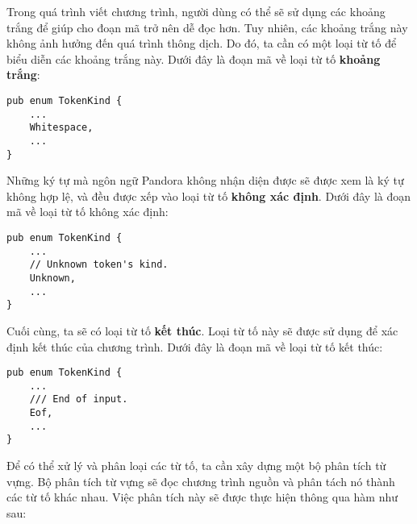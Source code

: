     Trong quá trình viết chương trình, người dùng có thể sẽ sử dụng các khoảng trắng để giúp cho đoạn mã trở nên dễ đọc hơn. Tuy nhiên, các khoảng trắng này không ảnh hưởng đến quá trình thông dịch. Do đó, ta cần có một loại từ tố để biểu diễn các khoảng trắng này. Dưới đây là đoạn mã về loại từ tố \textbf{khoảng trắng}:

\begin{lstlisting}[]
pub enum TokenKind {
    ...
    Whitespace,
    ...
}
\end{lstlisting}

    Những ký tự mà ngôn ngữ Pandora không nhận diện được sẽ được xem là ký tự không hợp lệ, và đều được xếp vào loại từ tố \textbf{không xác định}. Dưới đây là đoạn mã về loại từ tố không xác định:

\begin{lstlisting}[]
pub enum TokenKind {
    ...
    // Unknown token's kind.
    Unknown,
    ...
}
\end{lstlisting}

    Cuối cùng, ta sẽ có loại từ tố \textbf{kết thúc}. Loại từ tố này sẽ được sử dụng để xác định kết thúc của chương trình. Dưới đây là đoạn mã về loại từ tố kết thúc:

\begin{lstlisting}[]
pub enum TokenKind {
    ...
    /// End of input.
    Eof,
    ...
}
\end{lstlisting}

Để có thể xử lý và phân loại các từ tố, ta cần xây dựng một bộ phân tích từ vựng. Bộ phân tích từ vựng sẽ đọc chương trình nguồn và phân tách nó thành các từ tố khác nhau. Việc phân tích này sẽ được thực hiện thông qua hàm  như sau:

